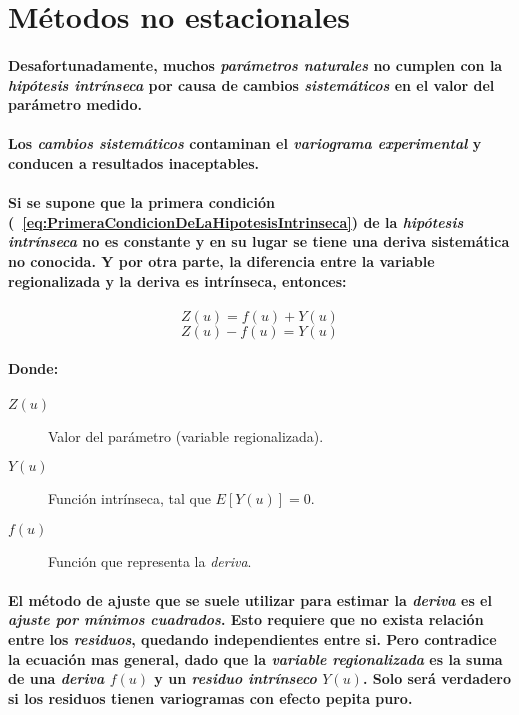 \section{Métodos no estacionales}
\paragraph{
Desafortunadamente, muchos \emph{parámetros naturales} no cumplen con la \emph{hipótesis intrínseca} por causa de cambios \emph{sistemáticos} en el valor del parámetro medido.
}
\paragraph{
Los \emph{cambios sistemáticos} contaminan el \emph{variograma experimental} y conducen a resultados inaceptables.
}
\paragraph{
Si se supone que la primera condición (~\ref{eq:PrimeraCondicionDeLaHipotesisIntrinseca}) de la \emph{hipótesis intrínseca} no es constante y en su lugar se tiene una deriva sistemática no conocida. Y por otra parte, la diferencia entre la variable regionalizada y la deriva es intrínseca, entonces:
}
\begin{equation}
\label{eq:VariableAleatoriaRegionalizadaConDeriva}
Z(u) = f(u) + Y(u)
\end{equation}
\begin{equation}
Z(u) - f(u) = Y(u)
\end{equation}
\paragraph{
Donde:
}
\begin{description}
\item[$Z(u)$] Valor del parámetro (variable regionalizada).
\item[$Y(u)$] Función intrínseca, tal que $E[Y(u)] = 0$.
\item[$f(u)$] Función que representa la \emph{deriva}.
\end{description}
\paragraph{
El método de ajuste que se suele utilizar para estimar la \emph{deriva} es el \emph{ajuste por mínimos cuadrados}. Esto requiere que no exista relación entre los \emph{residuos}, quedando independientes entre si. Pero contradice la ecuación mas general, dado que la \emph{variable regionalizada} es la suma de una \emph{deriva} $f(u)$ y un \emph{residuo intrínseco} $Y(u)$. Solo será verdadero si los residuos tienen variogramas con efecto pepita puro.
}
